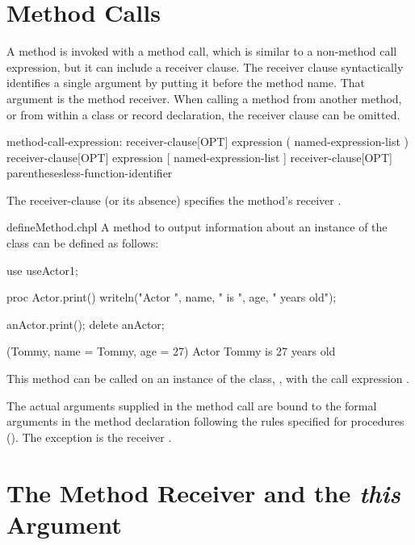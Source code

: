 \section{Method Calls}
\label{Method_Calls}

A method is invoked with a method call, which is similar to a non-method
call expression, but it can include a receiver clause. The receiver
clause syntactically identifies a single argument by
putting it before the method name. That argument is the method receiver.
When calling a method from another method, or from within a class or
record declaration, the receiver clause can be omitted.

\begin{syntax}
method-call-expression:
  receiver-clause[OPT] expression ( named-expression-list )
  receiver-clause[OPT] expression [ named-expression-list ]
  receiver-clause[OPT] parenthesesless-function-identifier
\end{syntax}

The receiver-clause (or its absence) specifies the method's receiver
.

\begin{chapelexample}{defineMethod.chpl}
A method to output information about an instance of the 
class can be defined as follows:
\begin{chapelpre}
use useActor1;
\end{chapelpre}
\begin{chapel}
proc Actor.print() {
  writeln("Actor ", name, " is ", age, " years old");
}
\end{chapel}
\begin{chapelpost}
anActor.print();
delete anActor;
\end{chapelpost}
\begin{chapeloutput}
(Tommy, {name = Tommy, age = 27})
Actor Tommy is 27 years old
\end{chapeloutput}
This method can be called on an instance of the 
class, , with the call expression .
\end{chapelexample}

The actual arguments supplied in the method call are bound to the
formal arguments in the method declaration following the rules specified for
procedures (). The exception is the receiver
.

\section{The Method Receiver and the {\em this} Argument}
\label{Method_receiver_and_this}

